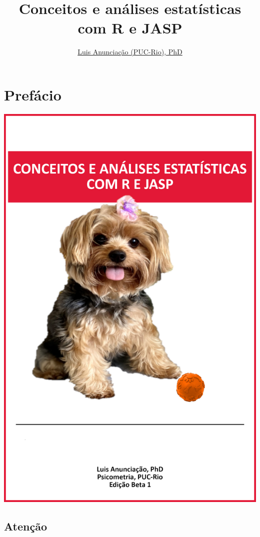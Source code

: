 \documentclass[
]{book}
\title{Conceitos e análises estatísticas com R e JASP}
\author{\href{mailto:\%20luisfca@puc-rio.br}{Luis Anunciação (PUC-Rio), PhD}}
\date{}
\begin{document}
\maketitle

{
\setcounter{tocdepth}{1}
\tableofcontents
}
\hypertarget{prefuxe1cio}{%
\chapter{Prefácio}\label{prefuxe1cio}}

\includegraphics{./img/capa_jolie.png}

\hypertarget{atenuxe7uxe3o}{%
\section{Atenção}\label{atenuxe7uxe3o}}
\end{document}
